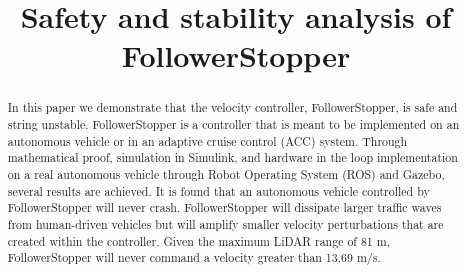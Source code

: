 \documentclass[conference]{IEEEtran}
\begin{document}
\title{Safety and stability analysis of FollowerStopper\\
}

\author{
\and
{}
\and
{}
\and
{}
}

\maketitle

\begin{abstract}
In this paper we demonstrate that the velocity controller, FollowerStopper, is safe and string unstable. FollowerStopper is a controller that is meant to be implemented on an autonomous vehicle or in an adaptive cruise control (ACC) system. Through mathematical proof, simulation in Simulink, and hardware in the loop implementation on a real autonomous vehicle through Robot Operating System (ROS) and Gazebo, several results are achieved. It is found that an autonomous vehicle controlled by FollowerStopper will never crash. FollowerStopper will dissipate larger traffic waves from human-driven vehicles but will amplify smaller velocity perturbations that are created within the controller. Given the maximum LiDAR range of 81 m, FollowerStopper will never command a velocity greater than 13.69 m/s.
\end{abstract}
\end{document}
